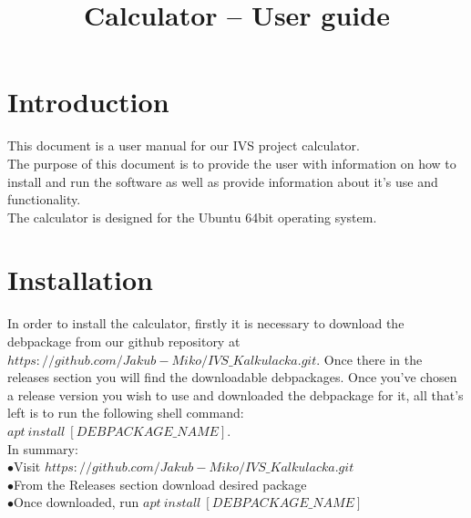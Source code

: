 \documentclass{article}
\title{Calculator -- User guide}
\date{}
\begin{document}
	\maketitle
	
	\tableofcontents
	
	\newpage
	
\section{Introduction}
	This document is a user manual for our IVS project calculator.\\
	The purpose of this document is to provide the user with information on how to install and run the software as well as provide information about it's use and functionality.\\
	The calculator is designed for the Ubuntu 64bit operating system.
	\newpage
	
\section{Installation}
	In order to install the calculator, firstly it is necessary to download the debpackage from our github repository at $https://github.com/Jakub-Miko/IVS\_Kalkulacka.git$. Once there in the releases section you will find the downloadable debpackages. Once you've chosen a release version you wish to use and downloaded the debpackage for it, all that's left is to run the following shell command: $apt\ install\ [DEBPACKAGE\_NAME]$.\\
	In summary:\\
	$\bullet$Visit $https://github.com/Jakub-Miko/IVS\_Kalkulacka.git$\\
	$\bullet$From the Releases section download desired package\\
	$\bullet$Once downloaded, run $apt\ install\ [DEBPACKAGE\_NAME]$
	\newpage
	
\end{document}
